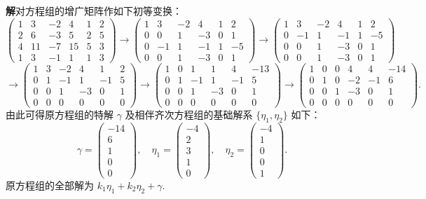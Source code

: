 \documentclass[UTF8,12pt,a4paper,fontset=fandol]{ctexart}
\begin{document}
\noindent\textbf{解}\quad 对方程组的增广矩阵作如下初等变换：
\[
\left(\begin{array}{rrrrr|r}
1&3&-2&4&1&2\\
2&6&-3&5&2&5\\
4&11&-7&15&5&3\\
1&3&-1&1&1&3
\end{array}\right)
\to
\left(\begin{array}{rrrrr|r}
1&3&-2&4&1&2\\
0&0&1&-3&0&1\\
0&-1&1&-1&1&-5\\
0&0&1&-3&0&1
\end{array}\right)
\to
\left(\begin{array}{rrrrr|r}
1&3&-2&4&1&2\\
0&-1&1&-1&1&-5\\
0&0&1&-3&0&1\\
0&0&1&-3&0&1
\end{array}\right)
\]
\[
\to
\left(\begin{array}{rrrrr|r}
1&3&-2&4&1&2\\
0&1&-1&1&-1&5\\
0&0&1&-3&0&1\\
0&0&0&0&0&0
\end{array}\right)
\to
\left(\begin{array}{rrrrr|r}
1&0&1&1&4&-13\\
0&1&-1&1&-1&5\\
0&0&1&-3&0&1\\
0&0&0&0&0&0
\end{array}\right)
\to
\left(\begin{array}{rrrrr|r}
1&0&0&4&4&-14\\
0&1&0&-2&-1&6\\
0&0&1&-3&0&1\\
0&0&0&0&0&0
\end{array}\right).
\]
由此可得原方程组的特解 $\gamma$ 及相伴齐次方程组的基础解系 $\{\eta_1,\eta_2\}$ 如下：
\[
\gamma=\left(\begin{array}{r}
-14\\
6\\
1\\
0\\
0
\end{array}\right),\quad
\eta_1=\left(\begin{array}{r}
-4\\
2\\
3\\
1\\
0
\end{array}\right),\quad
\eta_2=\left(\begin{array}{r}
-4\\
1\\
0\\
0\\
1
\end{array}\right).
\]
原方程组的全部解为 $k_1\eta_1+k_2\eta_2+\gamma$.
\end{document}
